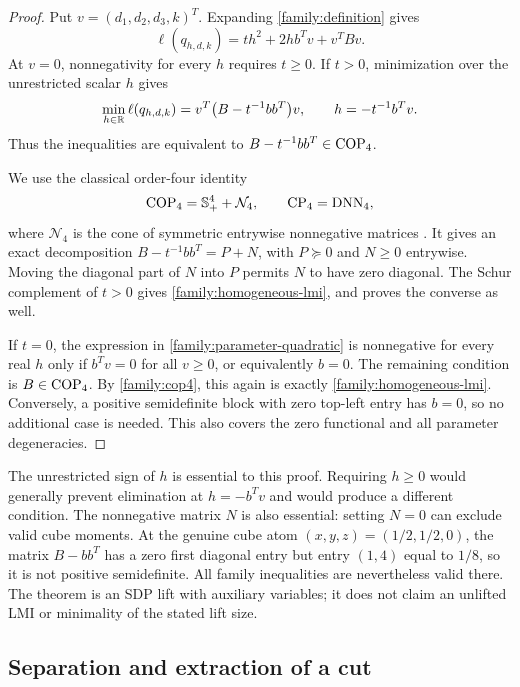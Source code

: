 \begin{proof}
Put $v=(d_1,d_2,d_3,k)^T$. Expanding
\eqref{family:definition} gives
\begin{equation}
\label{family:parameter-quadratic}
\ell(q_{h,d,k})=t h^2+2h b^Tv+v^TBv.
\end{equation}
At $v=0$, nonnegativity for every $h$ requires $t\ge0$.
If $t>0$, minimization over the unrestricted scalar $h$ gives
\[
\min_{h\in\mathbb R}\ell(q_{h,d,k})
  =v^T\bigl(B-t^{-1}bb^T\bigr)v,
\qquad h=-t^{-1}b^Tv.
\]
Thus the inequalities are equivalent to
$B-t^{-1}bb^T\in\operatorname{COP}_4$.

We use the classical order-four identity
\begin{equation}
\label{family:cop4}
\operatorname{COP}_4=\mathbb S^4_++\mathcal N_4,
\qquad
\operatorname{CP}_4=\operatorname{DNN}_4,
\end{equation}
where $\mathcal N_4$ is the cone of symmetric entrywise nonnegative
matrices \citep{Diananda1962,MaxfieldMinc1962}.
It gives an exact decomposition
$B-t^{-1}bb^T=P+N$, with $P\succeq0$ and $N\ge0$ entrywise.
Moving the diagonal part of $N$ into $P$ permits $N$ to have zero diagonal.
The Schur complement of $t>0$ gives
\eqref{family:homogeneous-lmi}, and proves the converse as well.

If $t=0$, the expression in \eqref{family:parameter-quadratic} is
nonnegative for every real $h$ only if $b^Tv=0$ for all $v\ge0$,
or equivalently $b=0$. The remaining condition is $B\in\operatorname{COP}_4$.
By \eqref{family:cop4}, this again is exactly
\eqref{family:homogeneous-lmi}. Conversely, a positive semidefinite block
with zero top-left entry has $b=0$, so no additional case is needed.
This also covers the zero functional and all parameter degeneracies.
\end{proof}

The unrestricted sign of $h$ is essential to this proof. Requiring
$h\ge0$ would generally prevent elimination at $h=-b^Tv$ and would
produce a different condition. The nonnegative matrix $N$ is also
essential: setting $N=0$ can exclude valid cube moments. At the genuine
cube atom $(x,y,z)=(1/2,1/2,0)$, the matrix $B-bb^T$ has a zero first
diagonal entry but entry $(1,4)$ equal to $1/8$, so it is not positive
semidefinite. All family inequalities are nevertheless valid there.
The theorem is an SDP lift with auxiliary variables; it does not claim
an unlifted LMI or minimality of the stated lift size.

\subsection{Separation and extraction of a cut}
\label{family:separation-subsection}


